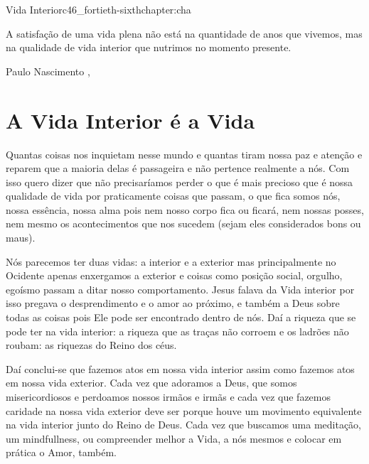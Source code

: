 \begin{chapterpage}{Vida Interior}{c46_fortieth-sixthchapter:cha}
 
\begin{myquotation}A satisfação de uma vida plena não está na quantidade de anos que vivemos, mas na qualidade de vida interior que nutrimos no momento presente.
\par\vspace*{15mm}
\mbox{}\hfill \emdash{}Paulo Nascimento
, %
\par\end{myquotation}

\end{chapterpage}



\section{A Vida Interior é a Vida}\label{c1_basicformatting:sec}

\emdash{}Quantas coisas nos inquietam nesse mundo e quantas tiram nossa paz e atenção e reparem que a maioria delas é passageira e não pertence realmente a nós. Com isso quero dizer que não precisaríamos perder o que é mais precioso que é nossa qualidade de vida por praticamente coisas que passam, o que fica somos nós, nossa essência, nossa alma pois nem nosso corpo fica ou ficará, nem nossas posses, nem mesmo os acontecimentos que nos sucedem (sejam eles considerados bons ou maus).

\emdash{}Nós parecemos ter duas vidas: a interior e a exterior mas principalmente no Ocidente apenas enxergamos a exterior e coisas como posição social, orgulho, egoísmo passam a ditar nosso comportamento. Jesus falava da Vida interior por isso pregava o desprendimento e o amor ao próximo, e também a Deus sobre todas as coisas pois Ele pode ser encontrado dentro de nós. Daí a riqueza que se pode ter na vida interior: a riqueza que as traças não corroem e os ladrões não roubam: as riquezas do Reino dos céus.

\emdash{}Daí conclui-se que fazemos atos em nossa vida interior assim como fazemos atos em nossa vida exterior. Cada vez que adoramos a Deus, que somos misericordiosos e perdoamos nossos irmãos e irmãs e cada vez que fazemos caridade na nossa vida exterior deve ser porque houve um movimento equivalente na vida interior junto do Reino de Deus. Cada vez que buscamos uma meditação, um mindfullness, ou compreender melhor a Vida, a nós mesmos e colocar em prática o Amor, também.

